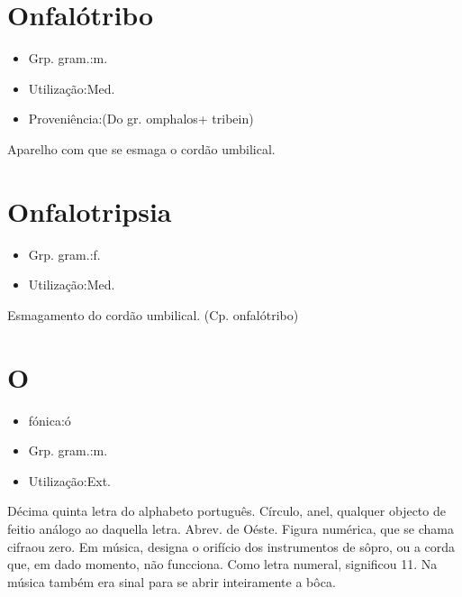 \section{Onfalótribo}
\begin{itemize}
\item {Grp. gram.:m.}
\end{itemize}
\begin{itemize}
\item {Utilização:Med.}
\end{itemize}
\begin{itemize}
\item {Proveniência:(Do gr. \textunderscore omphalos\textunderscore  + \textunderscore tribein\textunderscore )}
\end{itemize}
Aparelho com que se esmaga o cordão umbilical.
\section{Onfalotripsia}
\begin{itemize}
\item {Grp. gram.:f.}
\end{itemize}
\begin{itemize}
\item {Utilização:Med.}
\end{itemize}
Esmagamento do cordão umbilical.
(Cp. \textunderscore onfalótribo\textunderscore )
\section{O}
\begin{itemize}
\item {fónica:ó}
\end{itemize}
\begin{itemize}
\item {Grp. gram.:m.}
\end{itemize}
\begin{itemize}
\item {Utilização:Ext.}
\end{itemize}
Décima quinta letra do alphabeto português.
Círculo, anel, qualquer objecto de feitio análogo ao daquella letra.
Abrev. de \textunderscore Oéste\textunderscore .
Figura numérica, que se chama \textunderscore cifra\textunderscore  ou \textunderscore zero\textunderscore .
Em música, designa o orifício dos instrumentos de sôpro, ou a corda que, em dado momento, não funcciona.
Como letra numeral, significou 11.
Na música também era sinal para se abrir inteiramente a bôca.
